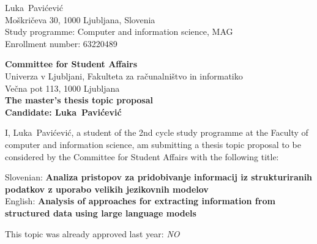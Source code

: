 \documentclass[a4paper, 12pt]{article}
\begin{document}
\newcommand{\ImeKandidata}{Luka} %
\newcommand{\PriimekKandidata}{Pavićević} %
\newcommand{\VpisnaStevilka}{63220489   } %
\newcommand{\StudyProgramme}{Computer and information science, MAG} %
\newcommand{\NaslovBivalisca}{ Moškričeva 30, 1000 Ljubljana, Slovenia } %
\newcommand{\SLONaslov}{Analiza pristopov za pridobivanje informacij iz strukturiranih 
podatkov z uporabo velikih jezikovnih modelov} %
\newcommand{\ENGNaslov}{Analysis of approaches for extracting information from structured data using large
language models} %

\newcommand{\ProblemParagraph}{\noindent\textbf{Problem \& State of the Art.} }
\newcommand{\ContributionsParagraph}{\noindent\textbf{Expected Contributions / Technical outcome. } }
\newcommand{\MethodologyParagraph}{\noindent\textbf{Methodology \& Validation. } }

\newcommand{\Kandidat}{\ImeKandidata~\PriimekKandidata}
\noindent
\Kandidat\\
\NaslovBivalisca \\
Study programme: \StudyProgramme \\
Enrollment number: \VpisnaStevilka
\bigskip

{\bf Committee for Student Affairs}\\
Univerza v Ljubljani, Fakulteta za računalništvo in informatiko\\
Večna pot 113, 1000 Ljubljana\\

{\Large\bf
  {\centering
    The master’s thesis topic proposal \\%
\large Candidate: \Kandidat \\[10mm]}}

I, \Kandidat, a student of the 2nd cycle study programme at the Faculty of computer and information science,
am submitting a thesis topic proposal to be considered by the Committee for Student Affairs with the following title:

Slovenian: {\bf \SLONaslov}\\
English: {\bf \ENGNaslov}

This topic was already approved last year: \textit{NO}
\end{document}
